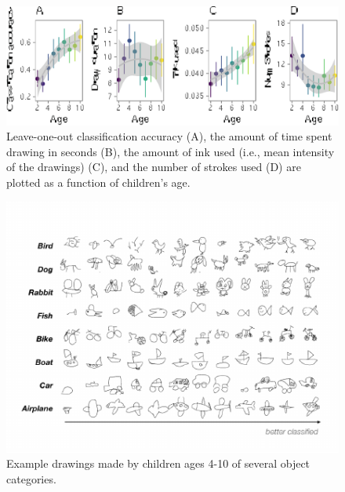 \documentclass[10pt, letterpaper]{article}
\newenvironment{CodeChunk}{}{}
\begin{document}
\begin{CodeChunk}
\begin{figure}[H]

{\centering \includegraphics{figs/unnamed-chunk-1-1} 

}

\caption[Leave-one-out classification accuracy (A), the amount of time spent drawing in seconds (B), the amount of ink used (i.e., mean intensity of the drawings) (C), and the number of strokes used (D) are plotted as a function of children’s age]{Leave-one-out classification accuracy (A), the amount of time spent drawing in seconds (B), the amount of ink used (i.e., mean intensity of the drawings) (C), and the number of strokes used (D) are plotted as a function of children’s age. }\label{fig:unnamed-chunk-1}
\end{figure}
\end{CodeChunk}

\begin{CodeChunk}
\begin{figure}[h]

{\centering \includegraphics[width=1\linewidth]{figs/exampleDrawings-1} 

}

\caption[Example drawings made by children ages 4-10 of several object categories]{Example drawings made by children ages 4-10 of several object categories.}\label{fig:exampleDrawings}
\end{figure}
\end{CodeChunk}
\end{document}
